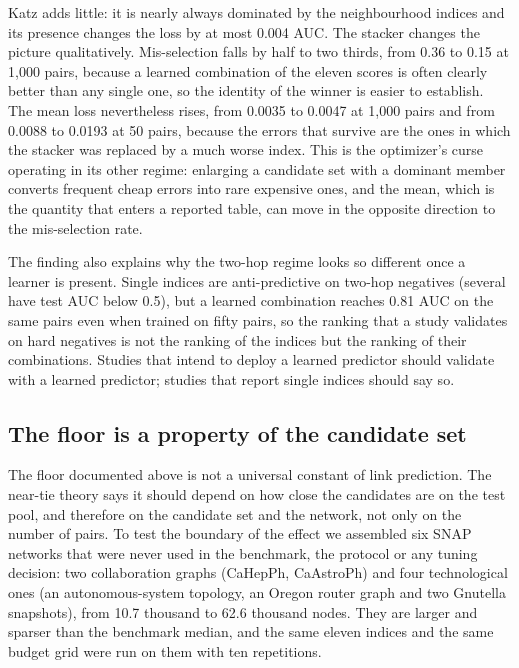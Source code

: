 \documentclass{comjnl}
\begin{document}
Katz adds little: it is nearly always dominated by the neighbourhood indices and its presence changes the loss by at most 0.004 AUC. The stacker changes the picture qualitatively. Mis-selection falls by half to two thirds, from 0.36 to 0.15 at 1{,}000 pairs, because a learned combination of the eleven scores is often clearly better than any single one, so the identity of the winner is easier to establish. The mean loss nevertheless rises, from 0.0035 to 0.0047 at 1{,}000 pairs and from 0.0088 to 0.0193 at 50 pairs, because the errors that survive are the ones in which the stacker was replaced by a much worse index. This is the optimizer's curse operating in its other regime: enlarging a candidate set with a dominant member converts frequent cheap errors into rare expensive ones, and the mean, which is the quantity that enters a reported table, can move in the opposite direction to the mis-selection rate.

The finding also explains why the two-hop regime looks so different once a learner is present. Single indices are anti-predictive on two-hop negatives (several have test AUC below 0.5), but a learned combination reaches 0.81 AUC on the same pairs even when trained on fifty pairs, so the ranking that a study validates on hard negatives is not the ranking of the indices but the ranking of their combinations. Studies that intend to deploy a learned predictor should validate with a learned predictor; studies that report single indices should say so.

\subsection{The floor is a property of the candidate set}
\label{sec:external}

The floor documented above is not a universal constant of link prediction. The
near-tie theory says it should depend on how close the candidates are on the
test pool, and therefore on the candidate set and the network, not only on the
number of pairs. To test the boundary of the effect we assembled six SNAP
networks that were never used in the benchmark, the protocol or any tuning
decision: two collaboration graphs (CaHepPh, CaAstroPh) and four technological
ones (an autonomous-system topology, an Oregon router graph and two Gnutella
snapshots), from 10.7 thousand to 62.6 thousand nodes. They are larger and
sparser than the benchmark median, and the same eleven indices and the same
budget grid were run on them with ten repetitions.
\end{document}
